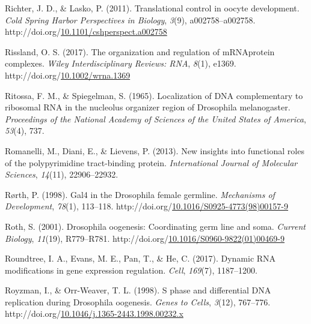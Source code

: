 \documentclass[12pt,oneside]{reedthesis}
\newlength{\cslhangindent}
\newenvironment{CSLReferences}[2] %
 {%
  \setlength{\parindent}{0pt}
  \ifodd #1 \everypar{\setlength{\hangindent}{\cslhangindent}}\ignorespaces\fi
  \ifnum #2 > 0
  \setlength{\parskip}{#2\baselineskip}
  \fi
 }%
 {}
\begin{document}
\begin{CSLReferences}{1}{0}
\leavevmode{}%
Richter, J. D., \& Lasko, P. (2011). Translational control in oocyte development. \emph{Cold Spring Harbor Perspectives in Biology}, \emph{3}(9), a002758--a002758. http://doi.org/\href{https://doi.org/10.1101/cshperspect.a002758}{10.1101/cshperspect.a002758}

\leavevmode{}%
Rissland, O. S. (2017). The organization and regulation of {mRNA}\textendash protein complexes. \emph{Wiley Interdisciplinary Reviews: RNA}, \emph{8}(1), e1369. http://doi.org/\href{https://doi.org/10.1002/wrna.1369}{10.1002/wrna.1369}

\leavevmode{}%
Ritossa, F. M., \& Spiegelman, S. (1965). Localization of {DNA} complementary to ribosomal {RNA} in the nucleolus organizer region of {Drosophila} melanogaster. \emph{Proceedings of the National Academy of Sciences of the United States of America}, \emph{53}(4), 737.

\leavevmode{}%
Romanelli, M., Diani, E., \& Lievens, P. (2013). New insights into functional roles of the polypyrimidine tract-binding protein. \emph{International Journal of Molecular Sciences}, \emph{14}(11), 22906--22932.

\leavevmode{}%
Rørth, P. (1998). Gal4 in the {Drosophila} female germline. \emph{Mechanisms of Development}, \emph{78}(1), 113--118. http://doi.org/\href{https://doi.org/10.1016/S0925-4773(98)00157-9}{10.1016/S0925-4773(98)00157-9}

\leavevmode{}%
Roth, S. (2001). Drosophila oogenesis: {Coordinating} germ line and soma. \emph{Current Biology}, \emph{11}(19), R779--R781. http://doi.org/\href{https://doi.org/10.1016/S0960-9822(01)00469-9}{10.1016/S0960-9822(01)00469-9}

\leavevmode{}%
Roundtree, I. A., Evans, M. E., Pan, T., \& He, C. (2017). Dynamic {RNA} modifications in gene expression regulation. \emph{Cell}, \emph{169}(7), 1187--1200.

\leavevmode{}%
Royzman, I., \& Orr-Weaver, T. L. (1998). S phase and differential {DNA} replication during {Drosophila} oogenesis. \emph{Genes to Cells}, \emph{3}(12), 767--776. http://doi.org/\href{https://doi.org/10.1046/j.1365-2443.1998.00232.x}{10.1046/j.1365-2443.1998.00232.x}


\end{CSLReferences}
\end{document}
